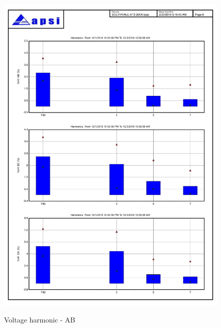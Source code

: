 \begin{figure}
	\includegraphics[width=\textwidth]{figures/fig_ch04_elecaudit_harmonicstudy01} \\
	\caption{Voltage harmonic - AB}
	\label{fig_ch04_elecaudit_harmonicstudy01} 
\end{figure}

